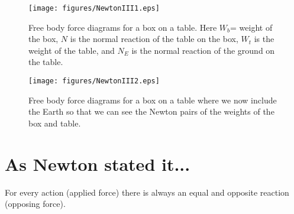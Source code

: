 





\addtolength{\topmargin}{-0.7 cm}
\setlength{\columnsep}{22pt}

\begin{wrapfigure}{r}{8cm}
\center
\texttt{[image: figures/NewtonIII1.eps]}
\caption{Free body force diagrams for a box on a table. Here $W_b$= weight of the box, $N$ is the normal reaction of the table on the box, $W_t$ is the weight of the table, and $N_E$ is the normal reaction of the ground on the table.} \label{NIII1}
\center
\texttt{[image: figures/NewtonIII2.eps]}
\caption{Free body force diagrams for a box on a table where we now include the Earth so that we can see the Newton pairs of the weights of the box and table.} \label{NIII2}
\end{wrapfigure}

\section{As Newton stated it...}
For every action (applied force) there is always an equal and opposite reaction (opposing force).

